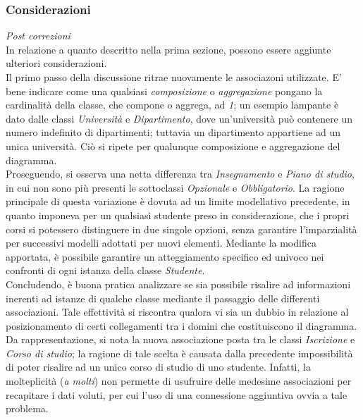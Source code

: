 \documentclass{article}
\begin{document}
\subsubsection*{Considerazioni}
\textit{Post correzioni}\\
In relazione a quanto descritto nella prima sezione, possono essere aggiunte ulteriori considerazioni.\vspace*{14pt}\\
Il primo passo della discussione ritrae nuovamente le associazoni utilizzate. E' bene indicare come una qualsiasi \textit{composizione} o \textit{aggregazione} pongano la cardinalità della classe, che compone o aggrega, ad \textit{1}; un esempio lampante è dato dalle classi \textit{Università} e \textit{Dipartimento}, dove un'università può contenere un numero indefinito di dipartimenti; tuttavia un dipartimento appartiene ad un unica università. Ciò si ripete per qualunque composizione e aggregazione del diagramma.\vspace*{14pt}\\
Proseguendo, si osserva una netta differenza tra \textit{Insegnamento} e \textit{Piano di studio}, in cui non sono più presenti le sottoclassi \textit{Opzionale} e \textit{Obbligatorio}. La ragione principale di questa variazione è dovuta ad un limite modellativo precedente, in quanto imponeva per un qualsiasi studente preso in considerazione, che i propri corsi si potessero distinguere in due singole opzioni, senza garantire l'imparzialità per successivi modelli adottati per nuovi elementi. Mediante la modifica apportata, è possibile garantire un atteggiamento specifico ed univoco nei confronti di ogni istanza della classe \textit{Studente}.\vspace*{14pt}\\
Concludendo, è buona pratica analizzare se sia possibile risalire ad informazioni inerenti ad istanze di qualche classe mediante il passaggio delle differenti associazioni. Tale effettività si riscontra qualora vi sia un dubbio in relazione al posizionamento di certi collegamenti tra i domini che costituiscono il diagramma. Da rappresentazione, si nota la nuova associazione posta tra le classi \textit{Iscrizione} e \textit{Corso di studio}; la ragione di tale scelta è causata dalla precedente impossibilità di poter risalire ad un unico corso di studio di uno studente. Infatti, la molteplicità (\textit{a molti}) non permette di usufruire delle medesime associazioni per recapitare i dati voluti, per cui l'uso di una connessione aggiuntiva ovvia a tale problema.
\end{document}
